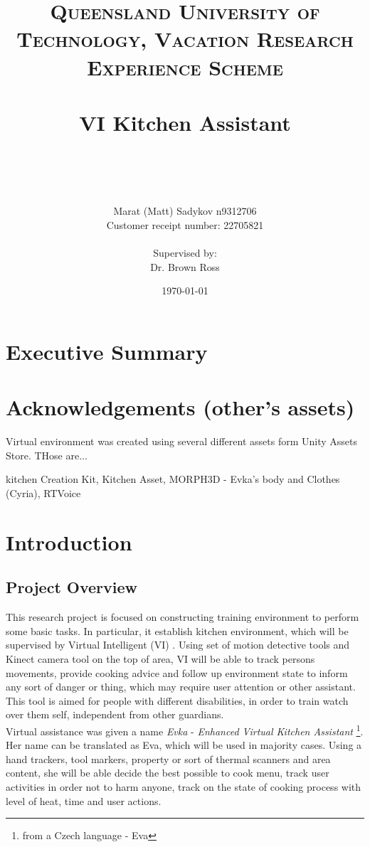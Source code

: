 \documentclass[18pt]{article}
\title{	
	\normalfont \normalsize 
	\textsc{Queensland University of Technology, Vacation Research Experience Scheme} \\ [25pt] 
	\horrule{0.5pt} \\[0.4cm] %
	\huge VI Kitchen Assistant \\ %
	\author{Marat (Matt) Sadykov \small n9312706 \\  Customer receipt number: \small 22705821 \\ \\ Supervised by: \\ Dr. Brown Ross \\ }
	\date{\normalsize\today} %
	\horrule{2pt} \\[0.5cm] %
}
\numberwithin{equation}{section} %
\numberwithin{figure}{section} %
\numberwithin{table}{section} %
\begin{document}
\maketitle
\renewcommand*\contentsname{Table of Contents}
\tableofcontents
\listoffigures
\newpage
\section{Executive Summary}
\section{Acknowledgements (other's assets)}	
	Virtual environment was created using several different assets form Unity Assets Store. THose are...
	
	\large kitchen Creation Kit, Kitchen Asset, MORPH3D - Evka's body and Clothes (Cyria), RTVoice\\
\section{Introduction}
\subsection{Project Overview}
	This research project is focused on constructing training environment to perform some basic tasks. In particular, it establish kitchen environment, which will be supervised by Virtual Intelligent (VI)  . Using set of motion detective tools and Kinect camera tool on the top of area, VI will be able to track persons movements, provide cooking advice and follow up environment state to inform any sort of danger or thing, which may require user attention or other assistant. This tool is aimed for people with different disabilities, in order to train watch over them self, independent from other guardians. \\
		
	Virtual assistance was given a name \textit{Evka} - \textit{Enhanced Virtual Kitchen Assistant} \footnote{from a Czech language - Eva}. Her name can be translated as Eva, which will be used in majority cases. Using a hand trackers, tool markers, property or sort of thermal scanners and area content, she will be able decide the best possible to cook menu, track user activities in order not to harm anyone, track on the state of cooking process with level of heat, time and user actions. \\	
	
\end{document}
